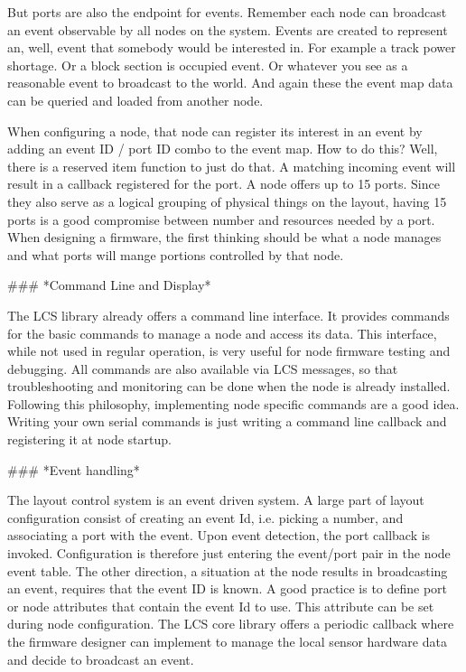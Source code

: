 But ports are also the endpoint for events. Remember each node can broadcast an event observable by all nodes on the system. Events are created to represent an, well, event that somebody would be interested in. For example a track power shortage. Or a block section is occupied event. Or whatever you see as a reasonable event to broadcast to the world. And again these the event map data can be queried and loaded from another node.

When configuring a node, that node can register its interest in an event by adding an event ID / port ID combo to the event map. How to do this? Well, there is a reserved item function to just do that. A matching incoming event will result in a callback registered for the port. A node offers up to 15 ports. Since they also serve as a logical grouping of physical things on the layout, having 15 ports is a good compromise between number and resources needed by a port. When designing a firmware, the first thinking should be what a node manages and what ports will mange portions controlled by that node.

### *Command Line and Display*

The LCS library already offers a command line interface. It provides commands for the basic commands to manage a node and access its data. This interface, while not used in regular operation, is very useful for node firmware testing and debugging. All commands are also available via LCS messages, so that troubleshooting and monitoring can be done when the node is already installed. Following this philosophy, implementing node specific commands are a good idea. Writing your own serial commands is just writing a command line callback and registering it at node startup.

### *Event handling*

The layout control system is an event driven system. A large part of layout configuration consist of creating an event Id, i.e. picking a number, and associating a port with the event. Upon event detection, the port callback is invoked. Configuration is therefore just entering the event/port pair in the node event table. The other direction, a situation at the node results in broadcasting an event, requires that the event ID is known. A good practice is to define port or node attributes that contain the event Id to use. This attribute can be set during node configuration. The LCS core library offers a periodic callback where the firmware designer can implement to manage the local sensor hardware data and decide to broadcast an event.

